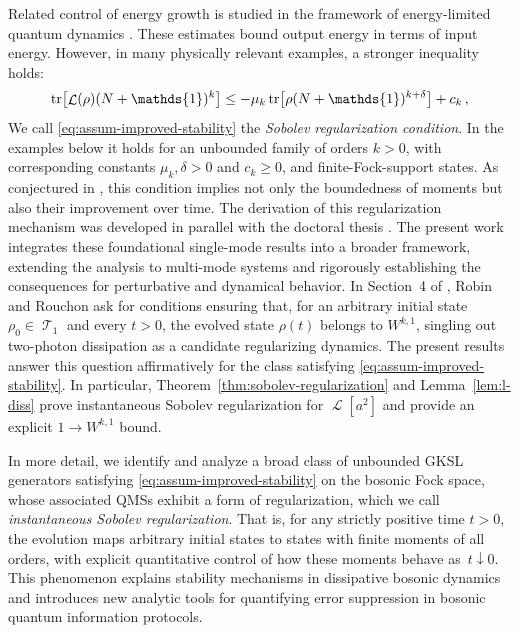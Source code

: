 \documentclass[11pt]{article}
\theoremstyle{myplain}
\theoremstyle{mydefinition}
\theoremstyle{remark}
\DeclareMathOperator{\cL}{\mathcal{L}}
\DeclareMathOperator{\cT}{\mathcal{T}}
\DeclareMathOperator{\1}{\mathds{1}}
\newcommand{\tr}[1][]{\operatorname{tr}%
  \ifx#1\empty \else \left[ #1 \right] \fi}
\begin{document}
    Related control of energy growth is studied in the framework of energy-limited quantum dynamics \cite{vanLuijk.2025}. These estimates bound output energy in terms of input energy. However, in many physically relevant examples, a stronger inequality holds:
    \begin{equation}\label{eq:assum-improved-stability}
        \tr\bigl[\cL(\rho)(N+\1)^{k}\bigr] \leq -\mu_{k}\tr\bigl[\rho(N+\1)^{k+\delta}\bigr] + c_{k}\,,
    \end{equation}
    We call \eqref{eq:assum-improved-stability} the \emph{Sobolev regularization condition}. In the examples below it holds for an unbounded family of orders $k>0$, with corresponding constants $\mu_k,\delta>0$ and $c_k\geq0$, and finite-Fock-support states. As conjectured in \cite{Gondolf.2024}, this condition implies not only the boundedness of moments but also their improvement over time. The derivation of this regularization mechanism was developed in parallel with the doctoral thesis \cite[Thm.~3.4.8 and Sec.~3.4.3, Eq.~(3.44)]{Gondolf.2025thesis}. The present work integrates these foundational single-mode results into a broader framework, extending the analysis to multi-mode systems and rigorously establishing the consequences for perturbative and dynamical behavior.
    In Section~4 of \cite{Robin.2025Galerkin}, Robin and Rouchon ask for conditions ensuring that, for an arbitrary initial state $\rho_0\in\cT_1$ and every $t>0$, the evolved state $\rho(t)$ belongs to $W^{k,1}$, singling out two-photon dissipation as a candidate regularizing dynamics. The present results answer this question affirmatively for the class satisfying \eqref{eq:assum-improved-stability}. In particular, Theorem~\ref{thm:sobolev-regularization} and Lemma~\ref{lem:l-diss} prove instantaneous Sobolev regularization for $\cL[a^2]$ and provide an explicit $1\to W^{k,1}$ bound.

    In more detail, we identify and analyze a broad class of unbounded GKSL generators satisfying \eqref{eq:assum-improved-stability} on the bosonic Fock space, whose associated QMSs exhibit a form of regularization, which we call \emph{instantaneous Sobolev regularization}. That is, for any strictly positive time $t > 0$, the evolution maps arbitrary initial states to states with finite moments of all orders, with explicit quantitative control of how these moments behave as~$t \downarrow 0$. This phenomenon explains stability mechanisms in dissipative bosonic dynamics and introduces new analytic tools for quantifying error suppression in bosonic quantum information protocols.
\end{document}
